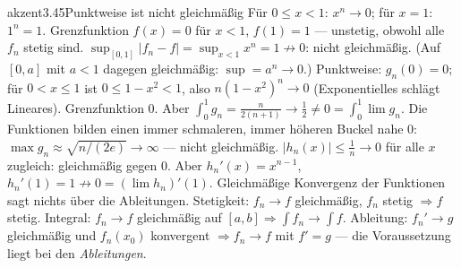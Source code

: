\begin{loesungkarte}{akzent}{3.45}{Punktweise ist nicht gleichmäßig}
Für $0\le x < 1$: $x^{n}\to0$; für $x = 1$: $1^{n} = 1$. Grenzfunktion $f(x) = 0$ für $x < 1$, $f(1) = 1$ --- unstetig, obwohl alle $f_n$ stetig sind. $\sup_{[0, 1]}|f_n - f| = \sup_{x < 1}x^{n} = 1\not\to0$: nicht gleichmäßig. (Auf $[0, a]$ mit $a < 1$ dagegen gleichmäßig: $\sup = a^{n}\to0$.)
Punktweise: $g_n(0) = 0$; für $0 < x\le1$ ist $0\le1 - x^{2} < 1$, also $n(1 - x^{2})^{n}\to0$ (Exponentielles schlägt Lineares). Grenzfunktion $0$. Aber $\int_0^1g_n = \frac n{2(n + 1)}\to\frac12\neq0 = \int_0^1\lim g_n$. Die Funktionen bilden einen immer schmaleren, immer höheren Buckel nahe $0$: $\max g_n\approx\sqrt{n/(2e)}\to\infty$ --- nicht gleichmäßig.
$|h_n(x)|\le\frac1n\to0$ für alle $x$ zugleich: gleichmäßig gegen $0$. Aber $h_n'(x) = x^{n-1}$, $h_n'(1) = 1\not\to0 = (\lim h_n)'(1)$. Gleichmäßige Konvergenz der Funktionen sagt nichts über die Ableitungen.
Stetigkeit: $f_n\to f$ gleichmäßig, $f_n$ stetig $\Rightarrow f$ stetig. Integral: $f_n\to f$ gleichmäßig auf $[a, b]\Rightarrow\int f_n\to\int f$. Ableitung: $f_n'\to g$ gleichmäßig und $f_n(x_0)$ konvergent $\Rightarrow f_n\to f$ mit $f' = g$ --- die Voraussetzung liegt bei den \emph{Ableitungen}.
\begin{center}
\qquad
{}
\end{center}

\end{loesungkarte}

